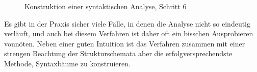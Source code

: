 \begin{figure}
  \caption{Konstruktion einer syntaktischen Analyse, Schritt 6}
  \label{fig:sya06}
\end{figure}

Es gibt in der Praxis sicher viele Fälle, in denen die Analyse nicht so eindeutig verläuft, und auch bei diesem Verfahren ist daher oft ein bisschen Ausprobieren vonnöten.
Neben einer guten Intuition ist das Verfahren zusammen mit einer strengen Beachtung der Strukturschemata aber die erfolgversprechendste Methode, Syntaxbäume zu konstruieren.

\Uebungen

